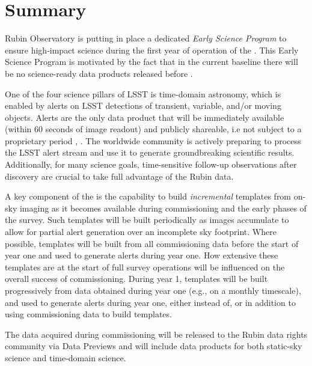 \section{Summary}

Rubin Observatory is putting in place a dedicated {\it Early Science Program} to ensure high-impact science during the first year of operation of the \lsst.
This Early Science Program is motivated by the fact that in the current baseline there will be no science-ready data products released before \drone. 

One of the four science pillars of LSST is time-domain astronomy, which is enabled by alerts on LSST detections of transient, variable, and/or moving objects. 
Alerts are the only data product that will be immediately available (within 60 seconds of image readout) and publicly shareable, i.e not subject to a proprietary period \citep{LSE-163},  \citep{RDO-013}. 
The worldwide community is actively preparing to process the LSST alert stream and use it to generate groundbreaking scientific results. Additionally, for many science goals, time-sensitive follow-up observations after discovery are crucial to take full advantage of the Rubin data. 

A key component of the \esp is the capability to build {\it incremental} templates from on-sky imaging as it becomes available during commissioning and the early phases of the survey. 
Such templates will be built periodically as images accumulate to allow for partial alert generation over an incomplete sky footprint.
Where possible, templates will be built from all commissioning data before the start of year one and used to generate alerts during year one.
How extensive these templates are at the start of full survey operations will be influenced on the overall success of commissioning.
During year 1, templates will be built progressively from data obtained during year one (e.g., on a monthly timescale), and used to generate alerts during year one, either instead of, or in addition to using commissioning data to build templates.

The data acquired during commissioning will be released to the Rubin data rights community via Data Previews and will include data products for both static-sky science and time-domain science.